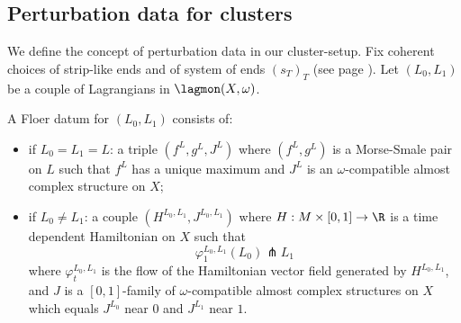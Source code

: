 
\subsection{Perturbation data for clusters}\label{pdgen}
We define the concept of perturbation data in our cluster-setup. Fix coherent choices of strip-like ends and of system of ends $(s_T)_T$ (see page \pageref{sistemofends}). 
Let $(L_0,L_1)$ be a couple of Lagrangians in $\lagmon(X,\omega)$. 

\begin{dfn}
	A Floer datum for $(L_0,L_1)$ consists of:\begin{itemize}
		\item if $L_0=L_1=L$: a triple $(f^L,g^L,J^L)$ where $(f^L,g^L)$ is a Morse-Smale pair on $L$ such that $f^L$ has a unique maximum and $J^L$ is an $\omega$-compatible almost complex structure on $X$;
		\item if $L_0\neq L_1$: a couple $(H^{L_0,L_1}, J^{L_0,L_1})$ where $H:M\times [0,1]\to \R$ is a time dependent Hamiltonian on $X$ such that $$\varphi^{L_0,L_1}_1(L_0)\pitchfork L_1$$ where $\varphi^{L_0,L_1}_t$ is the flow of the Hamiltonian vector field generated by $H^{L_0,L_1}$, and $J$ is a $[0,1]$-family of $\omega$-compatible almost complex structures on $X$ which equals $J^{L_0}$ near $0$ and $J^{L_1}$ near $1$.
	\end{itemize}
\end{dfn}

